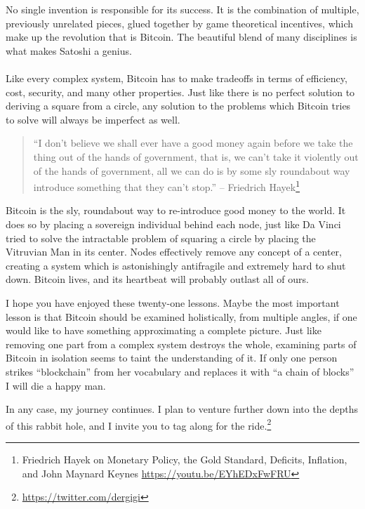 No single invention is responsible for its success. It is the combination of
multiple, previously unrelated pieces, glued together by game theoretical
incentives, which make up the revolution that is Bitcoin. The beautiful blend of
many disciplines is what makes Satoshi a genius.

\paragraph{} Like every complex system, Bitcoin has to make tradeoffs in terms
of efficiency, cost, security, and many other properties. Just like there is no
perfect solution to deriving a square from a circle, any solution to the
problems which Bitcoin tries to solve will always be imperfect as well.

\begin{quotation}
\enquote{I don’t believe we shall ever have a good money again before we take the
thing out of the hands of government, that is, we can’t take it violently
out of the hands of government, all we can do is by some sly roundabout way
introduce something that they can’t stop.}
\flushright -- Friedrich Hayek\footnote{Friedrich Hayek on Monetary Policy, the Gold Standard, Deficits, Inflation, and John Maynard Keynes \url{https://youtu.be/EYhEDxFwFRU}}
\end{quotation}

Bitcoin is the sly, roundabout way to re-introduce good money to the world. It
does so by placing a sovereign individual behind each node, just like Da Vinci
tried to solve the intractable problem of squaring a circle by placing the
Vitruvian Man in its center. Nodes effectively remove any concept of a center,
creating a system which is astonishingly antifragile and extremely hard to shut
down. Bitcoin lives, and its heartbeat will probably outlast all of ours.

I hope you have enjoyed these twenty-one lessons. Maybe the most important
lesson is that Bitcoin should be examined holistically, from multiple angles, if
one would like to have something approximating a complete picture. Just like
removing one part from a complex system destroys the whole, examining parts of
Bitcoin in isolation seems to taint the understanding of it. If only one person
strikes \enquote{blockchain} from her vocabulary and replaces it with \enquote{a
chain of blocks} I will die a happy man.

In any case, my journey continues. I plan to venture further down into the
depths of this rabbit hole, and I invite you to tag
along for the ride.\footnote{\url{https://twitter.com/dergigi}}

%
